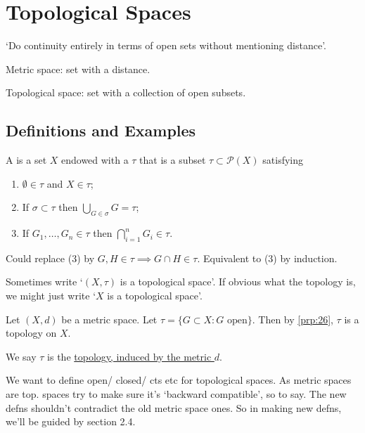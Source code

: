 \section{Topological Spaces}

`Do continuity entirely in terms of open sets without mentioning distance'.

Metric space: set with a distance.

Topological space: set with a collection of open subsets.

\subsection{Definitions and Examples}

\begin{definition}
    A  is a set $X$ endowed with a  $\tau$ that is a subset $\tau \subset \mathcal{P}(X)$ satisfying
    \begin{enumerate}
        \item $\emptyset \in \tau$ and $X \in \tau$;
        \item If $\sigma \subset \tau$ then $\bigcup_{G \in \sigma} G = \tau$;
        \item If $G_1, \dots, G_n \in \tau$ then $\bigcap_{i = 1}^n G_i \in \tau$.
    \end{enumerate} 
\end{definition} 

\begin{remark}
    Could replace (3) by $G, H \in \tau \implies G \cap H \in \tau$.
    Equivalent to (3) by induction.
\end{remark} 

\begin{notation}
    Sometimes write `$(X, \tau)$ is a topological space'.
    If obvious what the topology is, we might just write `$X$ is a topological space'.
\end{notation} 

\begin{example}
    Let $(X, d)$ be a metric space.
    Let $\tau = \{G \subset X : G \text{ open}\}$.
    Then by \cref{prp:26}, $\tau$ is a topology on $X$.

    We say $\tau$ is the \underline{topology, induced by the metric $d$}.
\end{example} 

We want to define open/ closed/ cts etc for topological spaces.
As metric spaces are top. spaces try to make sure it's `backward compatible', so to say.
The new defns shouldn't contradict the old metric space ones.
So in making new defns, we'll be guided by section 2.4.

